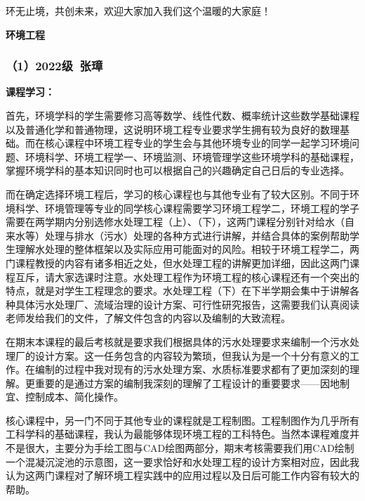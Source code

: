 \documentclass[11pt,oneside]{book}
\begin{document}
\vspace{10pt}

环无止境，共创未来，欢迎大家加入我们这个温暖的大家庭！

\vspace{10pt}

\textbf{环境工程}

\subsubsection{（1）2022级\ 张璋}
\textbf{课程学习：}

首先，环境学科的学生需要修习高等数学、线性代数、概率统计这些数学基础课程以及普通化学和普通物理，这说明环境工程专业要求学生拥有较为良好的数理基础。而在核心课程中环境工程专业的学生会与其他环境专业的同学一起学习环境问题、环境科学、环境工程学一、环境监测、环境管理学这些环境学科的基础课程，掌握环境学科的基本知识同时也可以根据自己的兴趣确定自己日后的专业选择。

\vspace{10pt}

而在确定选择环境工程后，学习的核心课程也与其他专业有了较大区别。不同于环境科学、环境管理等专业的同学核心课程需要学习环境工程学二，环境工程的学子需要在两学期内分别选修水处理工程（上）、（下），这两门课程分别针对给水（自来水等）处理与排水（污水）处理的各种方式进行讲解，并结合具体的案例帮助学生理解水处理的整体框架以及实际应用可能面对的风险。相较于环境工程学二，两门课程教授的内容有诸多相近之处，但水处理工程的讲解更加详细，因此这两门课程互斥，请大家选课时注意。水处理工程作为环境工程的核心课程还有一个突出的特点，就是对学生工程理念的要求。水处理工程（下）在下半学期会集中于讲解各种具体污水处理厂、流域治理的设计方案、可行性研究报告，这需要我们认真阅读老师发给我们的文件，了解文件包含的内容以及编制的大致流程。

\vspace{10pt}

在期末本课程的最后考核就是要求我们根据具体的污水处理要求来编制一个污水处理厂的设计方案。这一任务包含的内容较为繁琐，但我认为是一个十分有意义的工作。在编制的过程中我对现有的污水处理方案、水质标准要求都有了更加深刻的理解。更重要的是通过方案的编制我深刻的理解了工程设计的重要要求——因地制宜、控制成本、简化操作。

\vspace{10pt}

核心课程中，另一门不同于其他专业的课程就是工程制图。工程制图作为几乎所有工科学科的基础课程，我认为最能够体现环境工程的工科特色。当然本课程难度并不是很大，主要分为手绘工图与CAD绘图两部分，期末考核需要我们用CAD绘制一个混凝沉淀池的示意图，这一要求恰好和水处理工程的设计方案相对应，因此我认为这两门课程对了解环境工程实践中的应用过程以及日后可能工作内容有较大的帮助。
\end{document}
